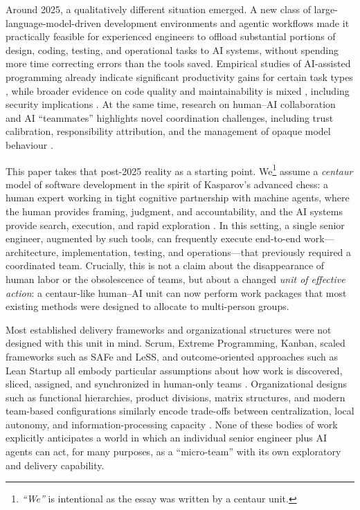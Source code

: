 \documentclass[11pt, a4paper, twocolumn]{article} %
\begin{document}
Around 2025, a qualitatively different situation emerged. A new class of
large-language-model-driven development environments and agentic workflows made
it practically feasible for experienced engineers to offload substantial
portions of design, coding, testing, and operational tasks to AI systems,
without spending more time correcting errors than the tools saved. Empirical
studies of AI-assisted programming already indicate significant productivity
gains for certain task types \citep{peng2023copilot}, while broader
evidence on code quality and maintainability is mixed \citep{ercin2025,schreiber2025aicodevuln},
including security implications \citep{oladele2025aivulnerabilities,schreiber2025aicodevuln}.
At the same time,
research on human--AI collaboration and AI ``teammates'' highlights novel
coordination challenges, including trust calibration, responsibility
attribution, and the management of opaque model behaviour
\citep{seeber2020machines,shneiderman2020human,schmutz2024aiteaming}.

This paper takes that post-2025 reality as a starting point. We\footnote{\scriptsize{\textit{``We''} is intentional as the essay was written by a centaur unit.}} assume a
\emph{centaur} model of software development in the spirit of Kasparov's
advanced chess: a human expert working in tight cognitive partnership with
machine agents, where the human provides framing, judgment, and accountability,
and the AI systems provide search, execution, and rapid exploration
\citep{kasparovadvancedchess,alvescipriano2023centaur}. In this setting, a
single senior engineer, augmented by such tools, can frequently execute
end-to-end work---architecture, implementation, testing, and operations---that
previously required a coordinated team. Crucially, this is not a claim about
the disappearance of human labor or the obsolescence of teams, but about a
changed \emph{unit of effective action}: a centaur-like human--AI unit can now
perform work packages that most existing methods were designed to allocate to
multi-person groups.

Most established delivery frameworks and organizational structures were not
designed with this unit in mind. Scrum, Extreme Programming, Kanban, scaled
frameworks such as SAFe and LeSS, and outcome-oriented approaches such as Lean
Startup all embody particular assumptions about how work is discovered, sliced,
assigned, and synchronized in human-only teams
\citep{beck1999xp,anderson2010kanban,scaledagile45reference,scaledagile5reference,scaledagile6update,larman2017less,ries2011lean}.
Organizational designs such as functional hierarchies, product divisions,
matrix structures, and modern team-based configurations similarly encode
trade-offs between centralization, local autonomy, and information-processing
capacity \citep{mintzberg1979,galbraith1974,senge1990,teamtopologies}. None of
these bodies of work explicitly anticipates a world in which an individual
senior engineer plus AI agents can act, for many purposes, as a ``micro-team''
with its own exploratory and delivery capability.
\end{document}

